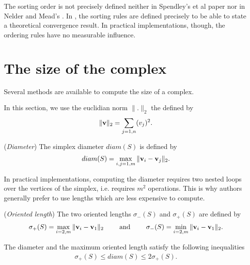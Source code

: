 The sorting order is not precisely defined neither in Spendley's et al paper \cite{Spendley1962}
nor in Nelder and Mead's \cite{citeulike:3009487}. 
In \cite{lagarias:112}, the sorting rules are defined precisely to be able to 
state a theoretical convergence result. In practical implementations, though, the 
ordering rules have no measurable influence.

\section{The size of the complex}
\label{section-simplexsize}

Several methods are available to compute the size of a complex.

In this section, we use  the euclidian norm $\|.\|_2$ 
the defined by 
\begin{eqnarray}
\|\mathbf{v}\|_2 = \sum_{j=1,n}(v_j)^2.
\end{eqnarray}

\begin{definition}
(\emph{Diameter})
The simplex diameter $diam(S)$ is defined by 
\begin{eqnarray}
\label{simplex-diameter}
diam(S) = \max_{i,j=1,m} \|\mathbf{v}_i - \mathbf{v}_j\|_2.
\end{eqnarray}
\end{definition}

In practical implementations, computing the diameter 
requires two nested loops over the 
vertices of the simplex, i.e. requires $m^2$ 
operations. This is why authors generally 
prefer to use lengths which are less expensive 
to compute.

\begin{definition}
(\emph{Oriented length})
The two oriented lengths $\sigma_-(S)$ and 
$\sigma_+(S)$ are defined by 
\begin{eqnarray}
\label{simplex-sigma}
\sigma_+(S) = \max_{i=2,m} \|\mathbf{v}_i - \mathbf{v}_1\|_2 
\qquad \textrm { and } \qquad \sigma_-(S) = \min_{i=2,m} \|\mathbf{v}_i - \mathbf{v}_1\|_2.
\end{eqnarray}
\end{definition}

\begin{proposition}
The diameter and the maximum oriented length
satisfy the following inequalities 
\begin{eqnarray}
\label{simplex-sigma-diam}
\sigma_+(S) \leq diam(S) \leq 2 \sigma_+(S).
\end{eqnarray}
\end{proposition}


